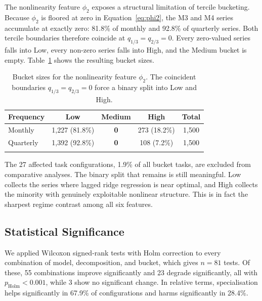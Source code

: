 \documentclass[pdflatex,sn-mathphys-num]{sn-jnl}
\theoremstyle{thmstyleone}
\theoremstyle{thmstyletwo}
\theoremstyle{thmstylethree}
\begin{document}
The nonlinearity feature $\phi_2$ exposes a structural limitation of tercile
bucketing. Because $\phi_2$ is floored at zero in Equation~\ref{eq:phi2}, the
M3 and M4 series accumulate at exactly zero: 81.8\% of monthly and 92.8\% of
quarterly series. Both tercile boundaries therefore coincide at
$q_{1/3} = q_{2/3} = 0$. Every zero-valued series falls into Low, every
non-zero series falls into High, and the Medium bucket is empty.
Table~\ref{tab:nonlin_buckets} shows the resulting bucket sizes.

\begin{table}[ht]
\caption{Bucket sizes for the nonlinearity feature $\phi_2$. The coincident
boundaries $q_{1/3} = q_{2/3} = 0$ force a binary split into Low and
High.}\label{tab:nonlin_buckets}
\begin{tabular}{lcccc}
\toprule
Frequency & Low & Medium & High & Total \\
\midrule
Monthly   & 1{,}227 (81.8\%) & \textbf{0} & 273 (18.2\%) & 1{,}500 \\
Quarterly & 1{,}392 (92.8\%) & \textbf{0} & 108 (7.2\%)  & 1{,}500 \\
\botrule
\end{tabular}
\end{table}

The 27 affected task configurations, 1.9\% of all bucket tasks, are excluded
from comparative analyses. The binary split that remains is still meaningful.
Low collects the series where lagged ridge regression is near optimal, and
High collects the minority with genuinely exploitable nonlinear structure.
This is in fact the sharpest regime contrast among all six features.

\subsection{Statistical Significance}\label{sec:significance}

We applied Wilcoxon signed-rank tests with Holm correction to every
combination of model, decomposition, and bucket, which gives $n = 81$ tests.
Of these, 55 combinations improve significantly and 23 degrade significantly,
all with $p_{\mathrm{Holm}} < 0.001$, while 3 show no significant change. In
relative terms, specialisation helps significantly in 67.9\% of configurations
and harms significantly in 28.4\%.
\end{document}

